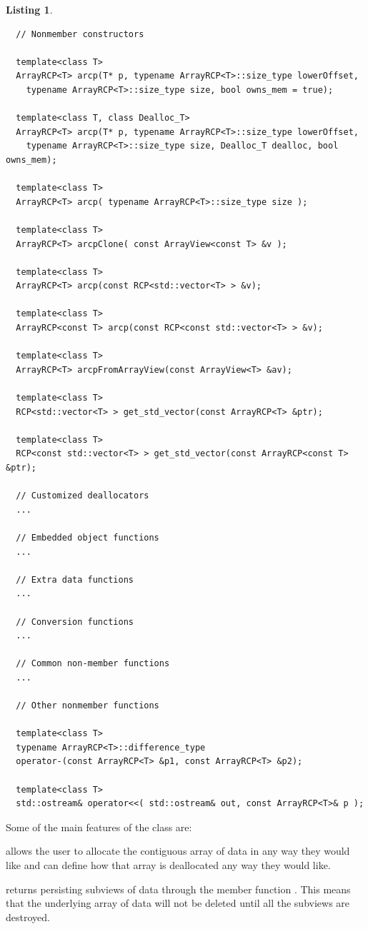 \documentclass[pdf,ps2pdf,11pt]{SANDreport}
\newtheorem{listing}{Listing}
\begin{document}
\begin{listing}
{\begin{verbatim}
  // Nonmember constructors
  
  template<class T>
  ArrayRCP<T> arcp(T* p, typename ArrayRCP<T>::size_type lowerOffset,
    typename ArrayRCP<T>::size_type size, bool owns_mem = true);
  
  template<class T, class Dealloc_T>
  ArrayRCP<T> arcp(T* p, typename ArrayRCP<T>::size_type lowerOffset,
    typename ArrayRCP<T>::size_type size, Dealloc_T dealloc, bool owns_mem);
  
  template<class T>
  ArrayRCP<T> arcp( typename ArrayRCP<T>::size_type size );
  
  template<class T>
  ArrayRCP<T> arcpClone( const ArrayView<const T> &v );
  
  template<class T>
  ArrayRCP<T> arcp(const RCP<std::vector<T> > &v);
  
  template<class T>
  ArrayRCP<const T> arcp(const RCP<const std::vector<T> > &v);
  
  template<class T>
  ArrayRCP<T> arcpFromArrayView(const ArrayView<T> &av);
  
  template<class T>
  RCP<std::vector<T> > get_std_vector(const ArrayRCP<T> &ptr);
  
  template<class T>
  RCP<const std::vector<T> > get_std_vector(const ArrayRCP<const T> &ptr);

  // Customized deallocators
  ...

  // Embedded object functions
  ...

  // Extra data functions
  ...

  // Conversion functions
  ...

  // Common non-member functions
  ...

  // Other nonmember functions
  
  template<class T>
  typename ArrayRCP<T>::difference_type
  operator-(const ArrayRCP<T> &p1, const ArrayRCP<T> &p2);
  
  template<class T>
  std::ostream& operator<<( std::ostream& out, const ArrayRCP<T>& p );
\end{verbatim}}
\end{listing}

Some of the main features of the {} class are:

{} allows the user to allocate the contiguous array
of data in any way they would like and can define how that array is
deallocated any way they would like.

{} returns persisting subviews of data through the
member function {}.  This means that the
underlying array of data will not be deleted until all the subviews
are destroyed.
\end{document}
